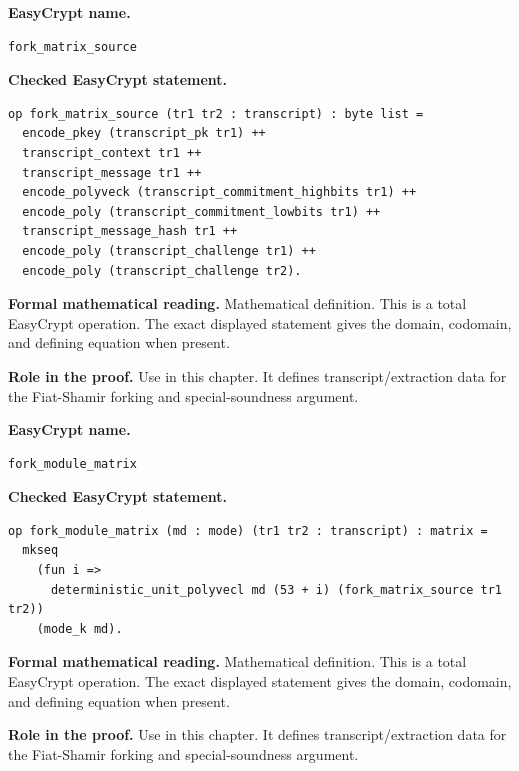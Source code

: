 \begin{formaldefinition}
\noindent\textbf{EasyCrypt name.}
\begin{lstlisting}[language=EasyCrypt,basicstyle=\ttfamily\scriptsize]
fork_matrix_source
\end{lstlisting}
\noindent\textbf{Checked EasyCrypt statement.}
\begin{lstlisting}[language=EasyCrypt,basicstyle=\ttfamily\scriptsize]
op fork_matrix_source (tr1 tr2 : transcript) : byte list =
  encode_pkey (transcript_pk tr1) ++
  transcript_context tr1 ++
  transcript_message tr1 ++
  encode_polyveck (transcript_commitment_highbits tr1) ++
  encode_poly (transcript_commitment_lowbits tr1) ++
  transcript_message_hash tr1 ++
  encode_poly (transcript_challenge tr1) ++
  encode_poly (transcript_challenge tr2).
\end{lstlisting}
\noindent\textbf{Formal mathematical reading.}
Mathematical definition. This is a total EasyCrypt operation.  The exact displayed statement gives the domain, codomain, and defining equation when present.

\noindent\textbf{Role in the proof.}
Use in this chapter. It defines transcript/extraction data for the Fiat-Shamir forking and special-soundness argument.

\end{formaldefinition}

\begin{formaldefinition}
\noindent\textbf{EasyCrypt name.}
\begin{lstlisting}[language=EasyCrypt,basicstyle=\ttfamily\scriptsize]
fork_module_matrix
\end{lstlisting}
\noindent\textbf{Checked EasyCrypt statement.}
\begin{lstlisting}[language=EasyCrypt,basicstyle=\ttfamily\scriptsize]
op fork_module_matrix (md : mode) (tr1 tr2 : transcript) : matrix =
  mkseq
    (fun i =>
      deterministic_unit_polyvecl md (53 + i) (fork_matrix_source tr1 tr2))
    (mode_k md).
\end{lstlisting}
\noindent\textbf{Formal mathematical reading.}
Mathematical definition. This is a total EasyCrypt operation.  The exact displayed statement gives the domain, codomain, and defining equation when present.

\noindent\textbf{Role in the proof.}
Use in this chapter. It defines transcript/extraction data for the Fiat-Shamir forking and special-soundness argument.

\end{formaldefinition}

